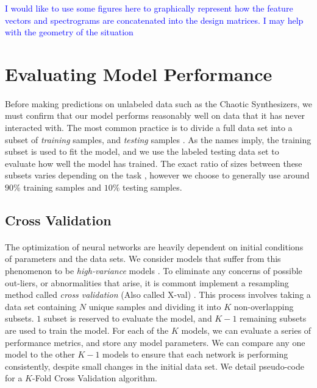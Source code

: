 \documentclass[12pt,letterpaper]{article}
\begin{document}
\textcolor{blue}{I would like to use some figures here to graphically represent how the feature vectors and spectrograms are concatenated into the design matrices. I may help with the geometry of the situation}




\newpage
\section{Evaluating Model Performance}
\label{sec-PerfEval}

\paragraph*{}Before making predictions on unlabeled data such as the Chaotic Synthesizers, we must confirm that our model performs reasonably well on data that it has never interacted with. The most common practice is to divide a full data set into a subset of \textit{training} samples, and \textit{testing} samples \cite{Geron}. As the names imply, the training subset is used to fit the model, and we use the labeled testing data set to evaluate how well the model has trained. The exact ratio of sizes between these subsets varies depending on the task \cite{Goodfellow,Geron2,Mitchell}, however we choose to generally use around $90\%$ training samples and $10\%$ testing samples.


\subsection{Cross Validation}
\label{subsec-XValidation}

\paragraph*{}The optimization of neural networks are heavily dependent on initial conditions of parameters and the data sets. We consider models that suffer from this phenomenon to be \textit{high-variance} models \cite{James}. To eliminate any concerns of possible out-liers, or abnormalities that arise, it is commont implement a resampling method called \textit{cross validation} (Also called X-val) \cite{Geron,Goodfellow}. This process involves taking a data set containing $N$ unique samples and dividing it into $K$ non-overlapping subsets. $1$ subset is reserved to evaluate the model, and $K-1$ remaining subsets are used to train the model. For each of the $K$ models, we can evaluate a series of performance metrics, and store any model parameters. We can compare any one model to the other $K-1$ models to ensure that each network is performing consistently, despite small changes in the initial data set. We detail pseudo-code for a $K$-Fold Cross Validation algorithm.
\end{document}
